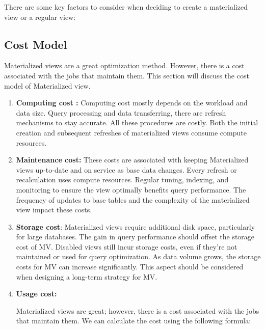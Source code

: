 There are some key factors to consider when deciding to create a materialized view or a regular view:\vspace{0.4cm}




 \subsection{Cost Model}
Materialized views are a great optimization method. However, there is a cost associated with the jobs that maintain them. This section will discuss the cost model of Materialized view.\vspace{.4cm}
 \begin{enumerate}[label=\alph*)]
    \item \textbf{Computing cost :} Computing cost mostly depends on the workload and data size. Query processing and data transferring, there are refresh mechanisms to stay accurate. All these procedures are costly. Both the initial creation and subsequent refreshes of materialized views consume compute resources.
    \item \textbf{Maintenance cost:} These costs are associated with keeping Materialized views up-to-date and on service as base data changes. Every refresh or recalculation uses compute resources. Regular tuning, indexing, and monitoring to ensure the view optimally benefits query performance. The frequency of updates to base tables and the complexity of the materialized view impact these costs. 
    \item \textbf{Storage cost}: Materialized views require additional disk space, particularly for large databases. The gain in query performance should offset the storage cost of MV. Disabled views still incur storage costs, even if they're not maintained or used for query optimization. As data volume grows, the storage costs for MV can increase significantly. This aspect should be considered when designing a long-term strategy for MV. 
    
    \item \textbf{Usage cost:}\vspace{.3cm}
    
    Materialized views are great; however, there is a cost associated with the jobs that maintain them. We can calculate the cost using the following formula:\cite{10.1145/2206869.2206874}

    
  
\end{enumerate}




